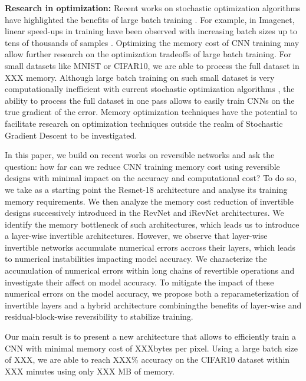 \documentclass[twocolumn]{bmcart}
\begin{document}
\textbf{Research in optimization:}
Recent works on stochastic optimization algorithms have highlighted the benefits of large batch training \cite{shallue2018measuring,largebatch}.
For example, in Imagenet, linear speed-ups in training have been observed with increasing batch sizes up to tens of thousands of samples \cite{largebatch}.
Optimizing the memory cost of CNN training may allow further research on the optimization tradeoffs of large batch training.
For small datasets like MNIST or CIFAR10, we are able to process the full dataset in XXX memory.
Although large batch training on such small dataset is very computationally inefficient with current stochastic optimization algorithms \cite{largebatch},
the ability to process the full dataset in one pass allows to easily train CNNs on the true gradient of the error.
Memory optimization techniques have the potential to facilitate research on optimization techniques outside the realm of Stochastic Gradient Descent to be investigated.

In this paper, we build on recent works on reversible networks \cite{gomez2017reversible,jacobsen2018revnet} and ask the question: 
how far can we reduce CNN training memory cost using reversible designs with minimal impact on the accuracy and computational cost?
To do so, we take as a starting point the Resnet-18 architecture and analyse its training memory requirements.
We then analyze the memory cost reduction of invertible designs successively introduced in the RevNet and iRevNet architectures.
We identify the memory bottleneck of such architectures, which leads us to introduce a layer-wise invertible architectures.
However, we observe that layer-wise invertible networks accumulate numerical errors accross their layers, which leads to numerical instabilities impacting model accuracy.  
We characterize the accumulation of numerical errors within long chains of revertible operations and investigate their affect on model accuracy.
To mitigate the impact of these numerical errors on the model accuracy, we propose both a reparameterization of invertible layers and a hybrid architecture combiningthe benefits of layer-wise and residual-block-wise reversibility to stabilize training.

Our main result is to present a new architecture that allows to efficiently train a CNN with minimal memory cost of XXXbytes per pixel.
Using a large batch size of XXX, we are able to reach XXX\% accuracy on the CIFAR10 dataset within XXX minutes using only XXX MB of memory. 
\end{document}
